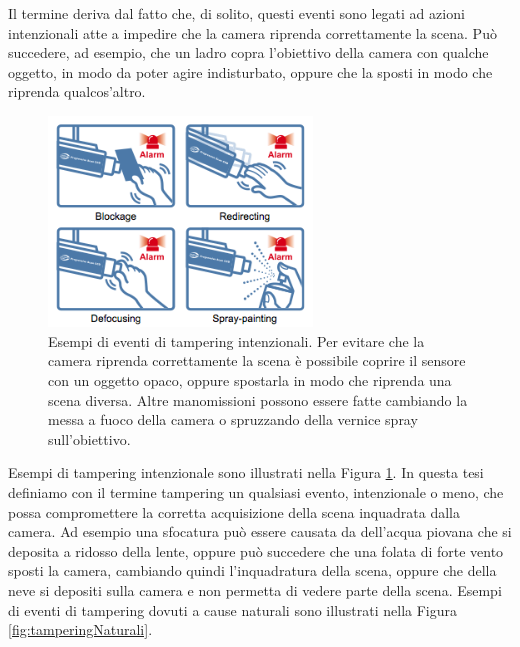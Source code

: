 Il termine deriva dal fatto che, di solito, questi eventi sono legati ad azioni intenzionali atte a impedire che la camera riprenda correttamente la scena.
Pu\`o succedere, ad esempio, che un ladro copra l'obiettivo della camera con qualche oggetto, in modo da poter agire indisturbato, oppure che la sposti in modo che riprenda qualcos'altro.
\begin{figure}
	\centering
	\includegraphics[width=7cm]{pictures/tamperdetection}
	\caption[Esempi di eventi di tampering intenzionali]{Esempi di eventi di tampering intenzionali. Per evitare che la camera riprenda correttamente la scena \`e possibile coprire il sensore con un oggetto opaco, oppure spostarla in modo che riprenda una scena diversa. Altre manomissioni possono essere fatte cambiando la messa a fuoco della camera o spruzzando della vernice spray sull'obiettivo.}
	\label{fig:tamperdetection}
\end{figure}
Esempi di tampering intenzionale sono illustrati nella Figura \ref{fig:tamperdetection}.
In questa tesi definiamo con il termine tampering un qualsiasi evento, intenzionale o meno, che possa compromettere la corretta acquisizione della scena inquadrata dalla camera.
Ad esempio una sfocatura pu\`o essere causata da dell'acqua piovana che si deposita a ridosso della lente, oppure pu\`o succedere che una folata di forte vento sposti la camera, cambiando quindi l'inquadratura della scena, oppure che della neve si depositi sulla camera e non permetta di vedere parte della scena.
Esempi di eventi di tampering dovuti a cause naturali sono illustrati nella Figura \ref{fig:tamperingNaturali}.
